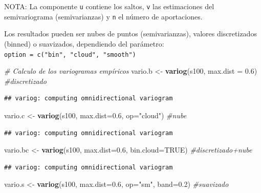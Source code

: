 \documentclass[
]{book}
\newenvironment{Shaded}{\begin{snugshade}}{\end{snugshade}}
\newcommand{\AttributeTok}[1]{\textcolor[rgb]{0.13,0.29,0.53}{#1}}
\newcommand{\CommentTok}[1]{\textcolor[rgb]{0.56,0.35,0.01}{\textit{#1}}}
\newcommand{\ConstantTok}[1]{\textcolor[rgb]{0.56,0.35,0.01}{#1}}
\newcommand{\FloatTok}[1]{\textcolor[rgb]{0.00,0.00,0.81}{#1}}
\newcommand{\FunctionTok}[1]{\textcolor[rgb]{0.13,0.29,0.53}{\textbf{#1}}}
\newcommand{\NormalTok}[1]{#1}
\newcommand{\OtherTok}[1]{\textcolor[rgb]{0.56,0.35,0.01}{#1}}
\newcommand{\StringTok}[1]{\textcolor[rgb]{0.31,0.60,0.02}{#1}}
\theoremstyle{break}
\theoremstyle{definition}
\theoremstyle{definition}
\theoremstyle{definition}
\theoremstyle{definition}
\theoremstyle{remark}
\begin{document}
NOTA: La componente \texttt{u} contiene los saltos, \texttt{v} las estimaciones del
semivariograma (semivarianzas) y \texttt{n} el número de aportaciones.

Los resultados pueden ser nubes de puntos (semivarianzas), valores
discretizados (binned) o suavizados, dependiendo del parámetro:
\texttt{option\ =\ c("bin",\ "cloud",\ "smooth")}

\begin{Shaded}
\begin{Highlighting}[]
\CommentTok{\# Calculo de los variogramas empíricos}
\NormalTok{vario.b }\OtherTok{\textless{}{-}} \FunctionTok{variog}\NormalTok{(s100, }\AttributeTok{max.dist =} \FloatTok{0.6}\NormalTok{) }\CommentTok{\#discretizado}
\end{Highlighting}
\end{Shaded}

\begin{verbatim}
## variog: computing omnidirectional variogram
\end{verbatim}

\begin{Shaded}
\begin{Highlighting}[]
\NormalTok{vario.c }\OtherTok{\textless{}{-}} \FunctionTok{variog}\NormalTok{(s100, }\AttributeTok{max.dist=}\FloatTok{0.6}\NormalTok{, }\AttributeTok{op=}\StringTok{"cloud"}\NormalTok{)  }\CommentTok{\#nube}
\end{Highlighting}
\end{Shaded}

\begin{verbatim}
## variog: computing omnidirectional variogram
\end{verbatim}

\begin{Shaded}
\begin{Highlighting}[]
\NormalTok{vario.bc }\OtherTok{\textless{}{-}} \FunctionTok{variog}\NormalTok{(s100, }\AttributeTok{max.dist=}\FloatTok{0.6}\NormalTok{, }\AttributeTok{bin.cloud=}\ConstantTok{TRUE}\NormalTok{)  }\CommentTok{\#discretizado+nube}
\end{Highlighting}
\end{Shaded}

\begin{verbatim}
## variog: computing omnidirectional variogram
\end{verbatim}

\begin{Shaded}
\begin{Highlighting}[]
\NormalTok{vario.s }\OtherTok{\textless{}{-}} \FunctionTok{variog}\NormalTok{(s100, }\AttributeTok{max.dist=}\FloatTok{0.6}\NormalTok{, }\AttributeTok{op=}\StringTok{"sm"}\NormalTok{, }\AttributeTok{band=}\FloatTok{0.2}\NormalTok{)  }\CommentTok{\#suavizado}
\end{Highlighting}
\end{Shaded}
\end{document}
